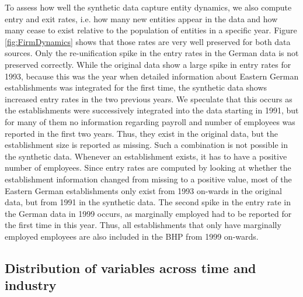 To assess how well the synthetic data capture entity dynamics, we also compute entry and exit rates, i.e. how many new entities appear in the data and how many cease to exist relative to the population of entities in a specific year. Figure \ref{fig:FirmDynamics} shows that those rates are very well preserved for both data sources. Only the re-unification spike in the entry rates in the German data is not preserved correctly. While the original data show a large spike in entry rates for 1993, because this was the year when detailed information about Eastern German establishments was integrated for the first time, the synthetic data shows increased entry rates in the two previous years. We speculate that this occurs as the establishments were successively integrated into the data starting in 1991, but for many of them no information regarding payroll and number of employees was reported in the first two years. Thus, they exist in the original data, but the establishment size is reported as missing. Such a combination is not possible in the synthetic data. Whenever an establishment exists, it has to have a positive number of employees. Since entry rates are computed by looking at whether the establishment information changed from missing to a positive value, most of the Eastern German establishments only exist from 1993 on-wards in the original data, but from 1991 in the synthetic data.
The second spike in the entry rate in the German data in 1999 occurs, as marginally employed had to be reported for the first time in this year. Thus, all establishments that only have marginally employed employees are also included in the BHP from 1999 on-wards.


\FloatBarrier


\subsection{Distribution of variables across time and industry}


